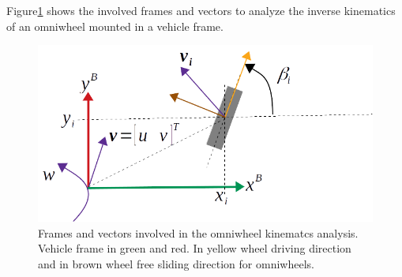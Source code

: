 Figure\ref{fig:omniwheel_kinematics} shows the involved frames and vectors to analyze the inverse kinematics of an omniwheel mounted in a vehicle frame.
\begin{figure}[bth!]
  \begin{center}
    \includegraphics[width=1.0\columnwidth]{figures/omniwheel_kinematics.png}
    \caption{Frames and vectors involved in the omniwheel kinematcs analysis. Vehicle frame in green and red. In yellow wheel driving direction and in brown wheel free sliding direction for omniwheels. }
    \label{fig:omniwheel_kinematics}
  \end{center}
\end{figure}


